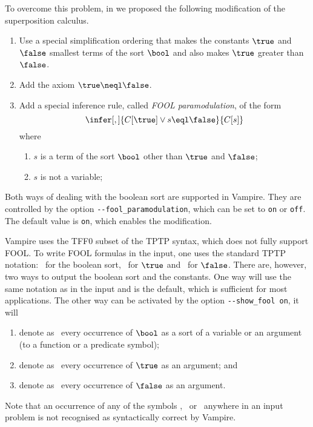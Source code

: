 To overcome this problem, in \cite{FOOL} we proposed the following modification of the superposition calculus.
\begin{enumerate}
  \item Use a special simplification ordering that makes the constants $\true$ and $\false$ smallest terms of the sort $\bool$ and also makes $\true$ greater than $\false$.

\item Add the axiom $\true \neql \false$.

\item Add a special inference rule, called \emph{FOOL paramodulation}, of the form
  \[
    \infer[,]{C[\mathtt{\true}] \lor s \eql \mathtt{\false}}{C[s]}
  \]
where
\begin{enumerate}
\item $s$ is a term of the sort $\bool$ other than $\true$ and $\false$;
\item $s$ is not a variable;
\end{enumerate}
\end{enumerate}

Both ways of dealing with the boolean sort are supported in Vampire. They are controlled by the option \verb|--fool_paramodulation|, which can be set to \verb|on| or \verb|off|. The default value is \verb|on|, which enables the modification.

Vampire uses the TFF0 subset of the TPTP syntax, which does not fully support FOOL. To write FOOL formulas in the input, one uses the standard TPTP notation: \tptpo\ for the boolean sort, \dtrue\ for $\true$ and \dfalse\ for $\false$. There are, however, two ways to output the boolean sort and the constants. One way will use the same notation as in the input and is the default, which is sufficient for most applications. The other way can be activated by the option \verb'--show_fool on', it will
\begin{enumerate}
  \item denote as \dbool\ every occurrence of $\bool$ as a sort of a variable or an argument (to a function or a predicate symbol);
  \item denote as \ddtrue\ every occurrence of $\true$ as an argument; and
  \item denote as \ddfalse\ every occurrence of $\false$ as an argument.
\end{enumerate}
Note that an occurrence of any of the symbols \dbool, \ddtrue\ or \ddfalse\ anywhere in an input problem is not recognised as syntactically correct by Vampire.

